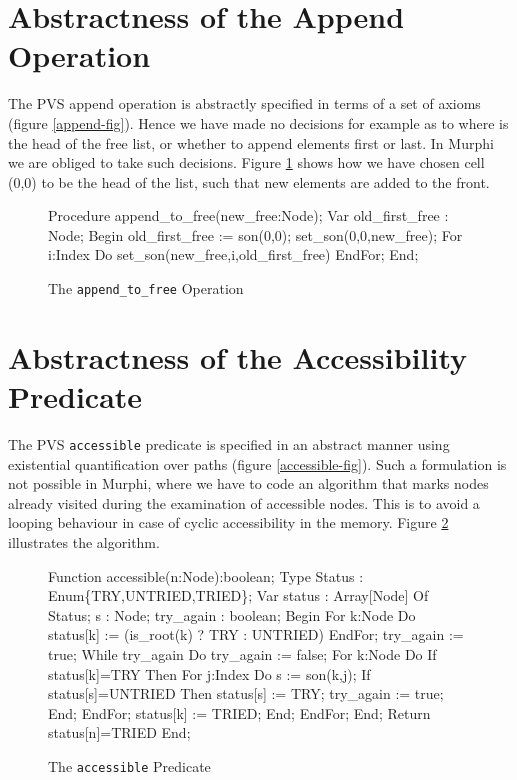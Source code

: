 \section*{Abstractness of the Append Operation}

The  PVS append operation is abstractly specified in terms of a set of
axioms (figure \ref{append-fig}). Hence  we have made no decisions for
example as to where is the head of the free list, or whether to append
elements first  or  last.   In Murphi  we are  obliged  to  take  such
decisions.  Figure \ref{murphi-append-fig}  shows how we  have  chosen
cell (0,0) to be the head of  the list,  such  that  new elements  are
added to the front.

\begin{figure}
\begin{smallsession}
Procedure append_to_free(new_free:Node);
Var
  old_first_free : Node;
Begin
  old_first_free := son(0,0);
  set_son(0,0,new_free);
  For i:Index Do set_son(new_free,i,old_first_free) EndFor;
End;
\end{smallsession}
\caption{The {\tt append\_to\_free} Operation}
\label{murphi-append-fig}
\end{figure}


\section*{Abstractness of the Accessibility Predicate}

The PVS {\tt accessible} predicate is specified in an abstract manner
using     existential    quantification     over     paths     (figure
\ref{accessible-fig}).  Such a  formulation is not possible in Murphi,
where we  have to  code an algorithm  that marks nodes already visited
during the  examination of  accessible  nodes.  This  is  to  avoid  a
looping  behaviour in case  of  cyclic  accessibility  in  the  memory.
Figure \ref{murphi-accessible-fig} illustrates the algorithm.

\begin{figure}
\begin{smallsession}
Function accessible(n:Node):boolean;
Type
  Status : Enum\{TRY,UNTRIED,TRIED\};
Var
  status : Array[Node] Of Status;
  s : Node;
  try_again : boolean;
Begin
  For k:Node Do
    status[k] := (is_root(k) ? TRY : UNTRIED)
  EndFor;
  try_again := true;
  While try_again Do
    try_again := false;
    For k:Node Do
      If status[k]=TRY Then
        For j:Index Do
          s := son(k,j);
          If status[s]=UNTRIED Then 
            status[s] := TRY; 
            try_again := true;            
          End;
        EndFor;
        status[k] := TRIED;
      End;
    EndFor;
  End; 
  Return status[n]=TRIED
End;
\end{smallsession}
\caption{The {\tt accessible} Predicate}
\label{murphi-accessible-fig}
\end{figure}


